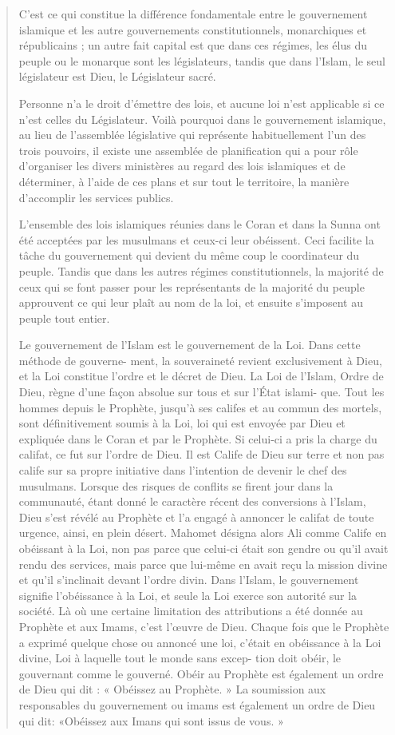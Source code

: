 \begin{quote}
C'est ce qui constitue la différence fondamentale entre le gouvernement
islamique et les autre gouvernements constitutionnels, monarchiques et
républicains ; un autre fait capital est que dans ces régimes, les élus
du peuple ou le monarque sont les législateurs, tandis que dans l'Islam,
le seul législateur est Dieu, le Législateur sacré.

Personne n'a le droit d'émettre des lois, et aucune loi n'est applicable
si ce n'est celles du Législateur. Voilà pourquoi dans le gouvernement
islamique, au lieu de l'assemblée législative qui représente
habituellement l'un des trois pouvoirs, il existe une assemblée de
planification qui a pour rôle d'organiser les divers ministères au
regard des lois islamiques et de déterminer, à l'aide de ces plans et
sur tout le territoire, la manière d'accomplir les services publics.

L'ensemble des lois islamiques réunies dans le Coran et dans la Sunna
ont été acceptées par les musulmans et ceux-ci leur obéissent. Ceci
facilite la tâche du gouvernement qui devient du même coup le
coordinateur du peuple. Tandis que dans les autres régimes
constitutionnels, la majorité de ceux qui se font passer pour les
représentants de la majorité du peuple approuvent ce qui leur plaît au
nom de la loi, et ensuite s'imposent au peuple tout entier.

Le gouvernement de l'Islam est le gouvernement de la Loi. Dans cette
méthode de gouverne- ment, la souveraineté revient exclusivement à Dieu,
et la Loi constitue l'ordre et le décret de Dieu. La Loi de l'Islam,
Ordre de Dieu, règne d'une façon absolue sur tous et sur l'État islami-
que. Tout les hommes depuis le Prophète, jusqu'à ses califes et au
commun des mortels, sont définitivement soumis à la Loi, loi qui est
envoyée par Dieu et expliquée dans le Coran et par le Prophète. Si
celui-ci a pris la charge du califat, ce fut sur l'ordre de Dieu. Il est
Calife de Dieu sur terre et non pas calife sur sa propre initiative dans
l'intention de devenir le chef des musulmans. Lorsque des risques de
conflits se firent jour dans la communauté, étant donné le caractère
récent des conversions à l'Islam, Dieu s'est révélé au Prophète et l'a
engagé à annoncer le califat de toute urgence, ainsi, en plein désert.
Mahomet désigna alors Ali comme Calife en obéissant à la Loi, non pas
parce que celui-ci était son gendre ou qu'il avait rendu des services,
mais parce que lui-même en avait reçu la mission divine et qu'il
s'inclinait devant l'ordre divin. Dans l'Islam, le gouvernement signifie
l'obéissance à la Loi, et seule la Loi exerce son autorité sur la
société. Là où une certaine limitation des attributions a été donnée au
Prophète et aux Imams, c'est l'œuvre de Dieu. Chaque fois que le
Prophète a exprimé quelque chose ou annoncé une loi, c'était en
obéissance à la Loi divine, Loi à laquelle tout le monde sans excep-
tion doit obéir, le gouvernant comme le gouverné. Obéir au Prophète est
également un ordre de Dieu qui dit : « Obéissez au Prophète. » La
soumission aux responsables du gouvernement ou imams est également un
ordre de Dieu qui dit: «Obéissez aux Imans qui sont issus de vous. »


\end{quote}
